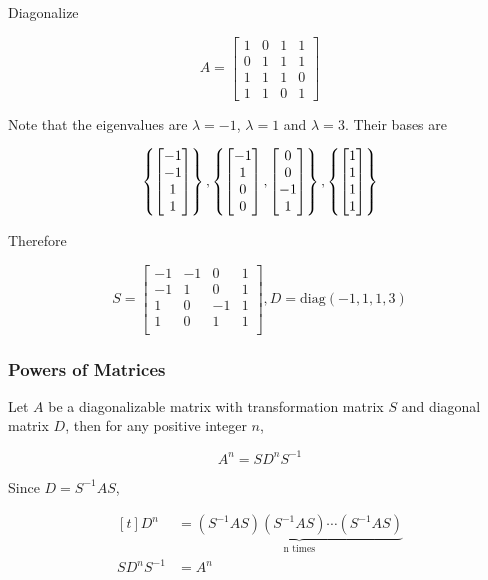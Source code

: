 \documentclass[a4paper,12pt]{article}
\begin{document}
\begin{exm}
  Diagonalize

  $$A=\begin{bmatrix}
    1 & 0 & 1 & 1\\
    0 & 1 & 1 & 1\\
    1 & 1 & 1 & 0\\
    1 & 1 & 0 & 1
  \end{bmatrix}$$\s

  \ans Note that the eigenvalues are $\lambda=-1$, $\lambda=1$ and $\lambda=3$. Their bases are
  
  $$\left\{ \begin{bmatrix}
    -1\\
    -1\\
    1\\
    1
  \end{bmatrix}\right\},\left\{ \begin{bmatrix}
    -1\\
    1\\
    0\\
    0
  \end{bmatrix},\begin{bmatrix}
    0\\
    0\\
    -1\\
    1
  \end{bmatrix}\right\},\left\{ \begin{bmatrix}
    1\\
    1\\
    1\\
    1
  \end{bmatrix}\right\}$$\s

  Therefore

  $$S=\begin{bmatrix}
    -1 & -1 & 0 & 1\\
    -1 & 1 & 0 & 1\\
    1 & 0 & -1 & 1\\
    1 & 0 & 1 & 1\\
  \end{bmatrix},D=\mathrm{diag}(-1,1,1,3)$$\s
\end{exm}

\subsubsection{Powers of Matrices}
\begin{pst}
  Let $A$ be a diagonalizable matrix with transformation matrix $S$ and diagonal matrix $D$, then for any positive integer $n$,

  $$A^{n}=SD^{n}S^{-1}$$\s

  \prf Since $D=S^{-1}AS$,

  $$\begin{aligned}[t]
    D^{n}&=\underset{\text{n times}}{\underbrace{(S^{-1}AS)(S^{-1}AS)\cdots(S^{-1}AS)}}\\
    SD^{n}S^{-1}&=A^{n}
  \end{aligned}$$
\end{pst}
\end{document}
